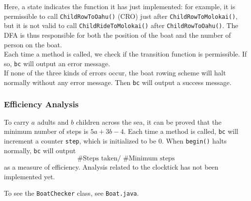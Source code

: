 \documentclass{article}
\begin{document}
\begin{spacing}{1.1}
\begin{center}
\end{center}
Here, a state indicates the function it has just implemented: for example, it is permissible to call \texttt{ChildRowToOahu()} (CRO) just after \texttt{ChildRowToMolokai()}, but it is not valid to call \texttt{ChildRideToMolokai()} after \texttt{ChildRowToOahu()}. The DFA is thus responsible for both the position of the boat and the number of person on the boat.\\
Each time a method is called, we check if the transition function is permissible. If so, \texttt{bc} will output an error message.\\
If none of the three kinds of errors occur, the boat rowing scheme will halt normally without any error message. Then \texttt{bc} will output a success message.\\
\subsubsection{Efficiency Analysis}
To carry $a$ adults and $b$ children across the sea, it can be proved that the minimum number of steps is $5a+3b-4$. Each time a method is called, \texttt{bc} will increment a counter \texttt{step}, which is initialized to be 0. When \texttt{begin()} halts normally, \texttt{bc} will output
$$\#\text{Steps taken/ \# Minimum steps}$$
as a measure of efficiency. Analysis related to the clocktick has not been implemented yet.\\
\end{spacing}
To see the \texttt{BoatChecker} class, see \texttt{Boat.java}.\\
\end{document}
